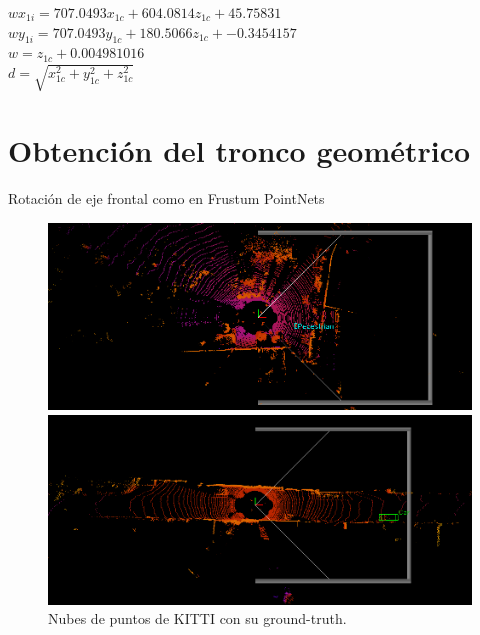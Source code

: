 \begin{center}
$w x_{1i}=707.0493 x_{1c}+604.0814 z_{1c}+45.75831$\\
$w y_{1i} = 707.0493 y_{1c} + 180.5066 z_{1c} + -0.3454157$\\
$w = z_{1c} + 0.004981016$\\
$d = \sqrt{x_{1c}^2 + y_{1c}^2 + z_{1c}^2}$
\end{center}

\section{Obtención del tronco geométrico}
\label{sec:Obtención del tronco geométrico}

Rotación de eje frontal como en Frustum PointNets

\begin{figure}[H]
	\begin{minipage}{0.495\textwidth}
		\centering
		\includegraphics[width=1\linewidth]{Book/figures/7_roi/kitti_pcl_0.png}
	\end{minipage}\hfill
	\begin{minipage}{0.495\textwidth}
		\centering
		\includegraphics[width=1\linewidth]{Book/figures/7_roi/kitti_pcl_2.png}
	\end{minipage}
	\caption{Nubes de puntos de KITTI con su ground-truth.}
	\label{fig:Nubes de puntos de KITTI con su ground-truth.}
\end{figure}

